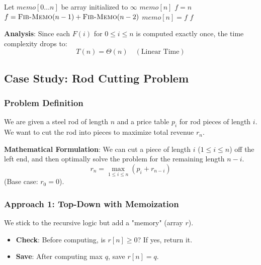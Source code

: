 \documentclass[12pt]{article}
\theoremstyle{blueplain}
\theoremstyle{bluedef}
\theoremstyle{blueremark}
\begin{document}
\begin{algorithm}
    \caption{Memoized-Fib(n)}
    \begin{algorithmic}[1]
        \State Let $memo[0 \dots n]$ be array initialized to $\infty$
         \Return $memo[n]$ 
        \EndIf
         $f = n$
        \Else \ $f = \Call{Fib-Memo}{n-1} + \Call{Fib-Memo}{n-2}$
        \EndIf
        \State $memo[n] = f$ 
        \Return $f$
        \EndProcedure
    \end{algorithmic}
\end{algorithm}
\textbf{Analysis}: Since each $F(i)$ for $0 \le i \le n$ is computed exactly once, the time complexity drops to:
\[ T(n) = \Theta(n) \quad (\text{Linear Time}) \]

\subsection{Case Study: Rod Cutting Problem}

\subsubsection{Problem Definition}
We are given a steel rod of length $n$ and a price table $p_i$ for rod pieces of length $i$. We want to cut the rod into pieces to maximize total revenue $r_n$.

\textbf{Mathematical Formulation}:
We can cut a piece of length $i$ ($1 \le i \le n$) off the left end, and then optimally solve the problem for the remaining length $n-i$.
\[ r_n = \max_{1 \le i \le n} (p_i + r_{n-i}) \]
(Base case: $r_0 = 0$).

\subsubsection{Approach 1: Top-Down with Memoization}
We stick to the recursive logic but add a "memory" (array $r$).
\begin{itemize}
    \item \textbf{Check}: Before computing, is $r[n] \ge 0$? If yes, return it.
    \item \textbf{Save}: After computing max $q$, save $r[n] = q$.
\end{itemize}
\end{document}
